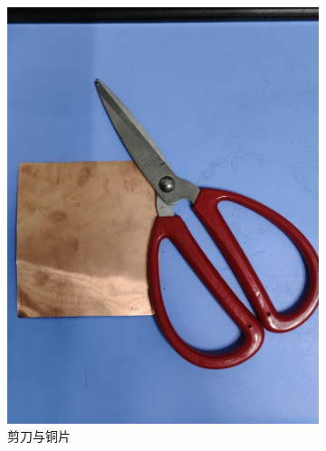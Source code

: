 \documentclass[a4paper]{report} %
\begin{document}
\begin{figure}[htbp]
\begin{subfigure}{0.22\textwidth}
        \includegraphics[width=\linewidth]{剪刀与铜片.jpg}
        \caption{剪刀与铜片}
    \end{subfigure}
    \begin{subfigure}{0.22\textwidth}

\end{subfigure}
\end{figure}
\end{document}
